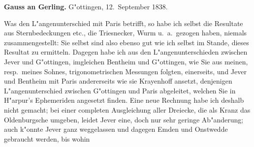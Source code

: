 \documentclass[12pt,a4paper]{article}
\theoremstyle{plain}
\theoremstyle{definition}
\theoremstyle{remark}
\begin{document}
\medskip
\noindent \textbf{Gauss an Gerling.} G"ottingen, 12.~September 1838.

\medskip
\noindent Was den L"angenunterschied mit Paris betrifft, so habe ich selbst die Resultate aus Sternbedeckungen etc., die Triesnecker, Wurm u.\ a.\ gezogen haben, niemals zusammengestellt: Sie selbst sind also ebenso gut wie ich selbst im Stande, dieses Resultat zu ermitteln. Dagegen habe ich aus den L"angenunterschieden zwischen Jever und G"ottingen, imgleichen Bentheim und G"ottingen, wie Sie aus meinen, resp.\ meines Sohnes, trigonometrischen Messungen folgten, einerseits, und Jever und Bentheim mit Paris andererseits wie sie Krayenhoff ansetzt, denjenigen L"angenunterschied zwischen G"ottingen und Paris abgeleitet, welchen Sie in H"arpur's Ephemeriden angesetzt finden. Eine neue Rechnung habe ich deshalb nicht gemacht; bei einer completen Ausgleichung aller Dreiecke, die als Kranz das Oldenburgsche umgeben, leidet Jever eine, doch nur sehr geringe Ab"anderung; auch k"onnte Jever ganz weggelassen und dagegen Emden und Onstwedde gebraucht werden, bis wohin
\end{document}
